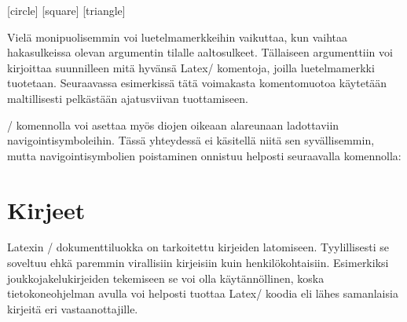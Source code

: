 \begin{koodilohkosis}
[circle]          %
[square]       %
[triangle]  %
\end{koodilohkosis}

\noindent
Vielä monipuolisemmin voi luetelmamerkkeihin vaikuttaa, kun vaihtaa
hakasulkeissa olevan argumentin tilalle aaltosulkeet. Tällaiseen
argumenttiin voi kirjoittaa suunnilleen mitä hyvänsä Latex\-/ komentoja,
joilla luetelmamerkki tuotetaan. Seuraavassa esimerkissä tätä voimakasta
komentomuotoa käytetään maltillisesti pelkästään ajatusviivan
tuottamiseen.

\begin{koodilohkosis}
\end{koodilohkosis}

\noindent
{}\-/ komennolla voi asettaa myös diojen
oikeaan alareunaan ladottaviin navigointisymboleihin. Tässä yhteydessä
ei käsitellä niitä sen syvällisemmin, mutta navigointisymbolien
poistaminen onnistuu helposti seuraavalla komennolla:

\begin{koodilohkosis}
\end{koodilohkosis}

\section{Kirjeet}
\label{luku/kirjeet}

Latexin \-/ dokumenttiluokka on tarkoitettu kirjeiden
latomiseen. Tyylillisesti se soveltuu ehkä paremmin virallisiin
kirjeisiin kuin henkilökohtaisiin. Esimerkiksi joukkojakelukirjeiden
tekemiseen se voi olla käytännöllinen, koska tietokoneohjelman avulla
voi helposti tuottaa Latex\-/ koodia eli lähes samanlaisia kirjeitä eri
vastaanottajille.

